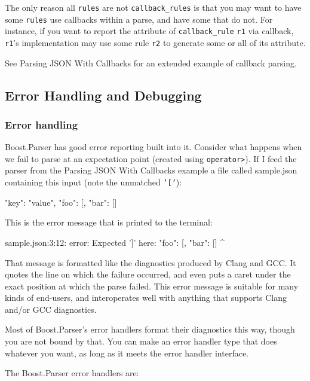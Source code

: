 The only reason all \texttt{rules} are not \texttt{callback\_rules} is that you may want to have some \texttt{rules} use callbacks within a parse, and have some that do not. For instance, if you want to report the attribute of \texttt{callback\_rule} \texttt{r1} via callback, \texttt{r1}'s implementation may use some rule \texttt{r2} to generate some or all of its attribute.

See Parsing JSON With Callbacks for an extended example of callback parsing.

\subsection{Error Handling and Debugging}

\subsubsection{Error handling}

Boost.Parser has good error reporting built into it. Consider what happens when we fail to parse at an expectation point (created using \texttt{operator>}). If I feed the parser from the Parsing JSON With Callbacks example a file called sample.json containing this input (note the unmatched \texttt{'{[}'}):

\begin{code}
{
    "key": "value",
    "foo": [, "bar": []
}
\end{code}

This is the error message that is printed to the terminal:

\begin{code}
sample.json:3:12: error: Expected ']' here:
    "foo": [, "bar": []
            ^
\end{code}

That message is formatted like the diagnostics produced by Clang and GCC. It quotes the line on which the failure occurred, and even puts a caret under the exact position at which the parse failed. This error message is suitable for many kinds of end-users, and interoperates well with anything that supports Clang and/or GCC diagnostics.

Most of Boost.Parser's error handlers format their diagnostics this way, though you are not bound by that. You can make an error handler type that does whatever you want, as long as it meets the error handler interface.

The Boost.Parser error handlers are:

